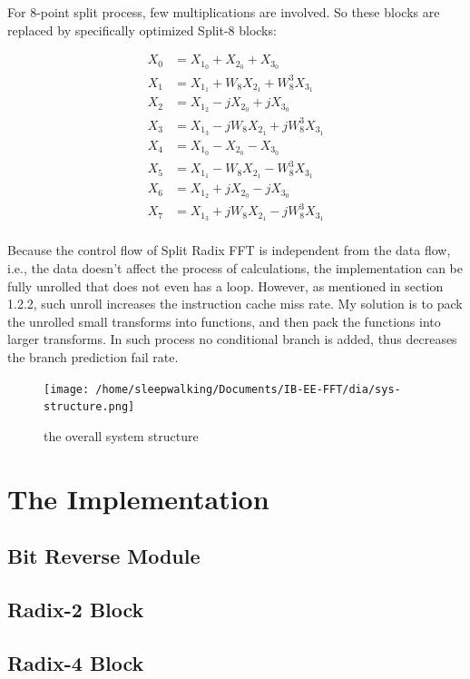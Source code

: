 \documentclass[a4paper]{report}
\begin{document}
	For 8-point split process, few multiplications are involved. So these blocks are replaced by specifically optimized Split-8 blocks:

\[\begin{split}
  X_{0} & = X_{1_0} + X_{2_0} + X_{3_0}\\
  X_{1} & = X_{1_1} + W_8 X_{2_1} + W_8^3 X_{3_1}\\
  X_{2} & = X_{1_2} - jX_{2_0} + j X_{3_0}\\
  X_{3} & = X_{1_3} - jW_8 X_{2_1} + jW_8^3 X_{3_1}\\
  X_{4} & = X_{1_0} - X_{2_0} - X_{3_0}\\
  X_{5} & = X_{1_1} - W_8 X_{2_1} - W_8^3 X_{3_1}\\
  X_{6} & = X_{1_2} + jX_{2_0} - jX_{3_0}\\
  X_{7} & = X_{1_3} + jW_8 X_{2_1} - jW_8^3 X_{3_1}\\
\end{split}\]

	Because the control flow of Split Radix FFT is independent from the data flow, i.e., the data doesn't affect the process of calculations, the implementation can be fully unrolled that does not even has a loop. However, as mentioned in section 1.2.2, such unroll increases the instruction cache miss rate. My solution is to pack the unrolled small transforms into functions, and then pack the functions into larger transforms. In such process no conditional branch is added, thus decreases the branch prediction fail rate.

\begin{figure}[htp]
\centering
\texttt{[image: /home/sleepwalking/Documents/IB-EE-FFT/dia/sys-structure.png]}
\caption{the overall system structure}
\label{}
\end{figure}
\chapter{The Implementation}

\section{Bit Reverse Module} \indent

\section{Radix-2 Block} \indent

\section{Radix-4 Block} \indent
\end{document}
